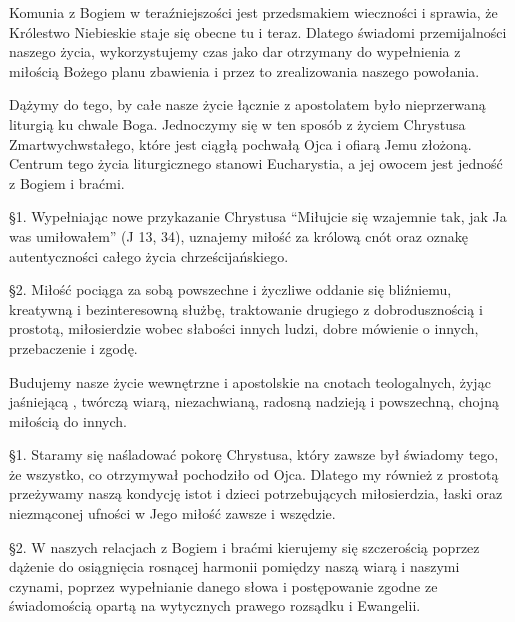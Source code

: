 

 Komunia z Bogiem w teraźniejszości jest przedsmakiem wieczności i sprawia, że Królestwo Niebieskie staje się obecne tu i teraz. Dlatego  świadomi przemijalności naszego życia, wykorzystujemy czas jako dar otrzymany do wypełnienia z miłością Bożego planu zbawienia i przez to zrealizowania naszego powołania.


 
 Dążymy do tego, by całe nasze życie łącznie z apostolatem było nieprzerwaną liturgią ku chwale Boga. Jednoczymy się w ten sposób z życiem Chrystusa Zmartwychwstałego, które jest ciągłą pochwałą Ojca i ofiarą Jemu złożoną. Centrum tego życia liturgicznego stanowi Eucharystia, a jej owocem jest jedność z Bogiem i braćmi.
 
 
 \S{}1. Wypełniając nowe przykazanie Chrystusa “Miłujcie się wzajemnie tak, jak Ja was umiłowałem” (J 13, 34), uznajemy miłość za królową cnót oraz oznakę autentyczności całego życia chrześcijańskiego.


\S{}2. Miłość pociąga za sobą powszechne i życzliwe oddanie się bliźniemu, kreatywną i bezinteresowną służbę, traktowanie drugiego z dobrodusznością i prostotą, miłosierdzie wobec słabości innych ludzi, dobre mówienie o innych, przebaczenie i zgodę.
 


 Budujemy nasze życie wewnętrzne i apostolskie na cnotach teologalnych, żyjąc jaśniejącą , twórczą wiarą, niezachwianą, radosną nadzieją i powszechną, chojną miłością do innych. 
 
\filbreak{}
 
 \S{}1. Staramy się naśladować pokorę Chrystusa, który zawsze był świadomy tego, że wszystko, co otrzymywał pochodziło od Ojca. Dlatego my również z prostotą przeżywamy naszą kondycję istot i dzieci potrzebujących miłosierdzia, łaski oraz niezmąconej ufności w Jego miłość zawsze i wszędzie.


\S{}2. W naszych relacjach z Bogiem i braćmi kierujemy się szczerością poprzez dążenie do osiągnięcia rosnącej harmonii pomiędzy naszą wiarą i naszymi czynami, poprzez wypełnianie danego słowa i postępowanie zgodne ze świadomością opartą na wytycznych prawego rozsądku i Ewangelii.
 
 
